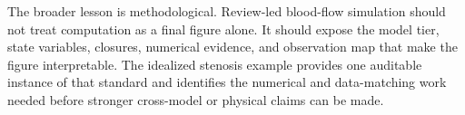 The broader lesson is methodological. Review-led blood-flow simulation should
not treat computation as a final figure alone. It should expose the model tier,
state variables, closures, numerical evidence, and observation map that make the
figure interpretable. The idealized stenosis example provides one auditable
instance of that standard and identifies the numerical and data-matching work
needed before stronger cross-model or physical claims can be made.
